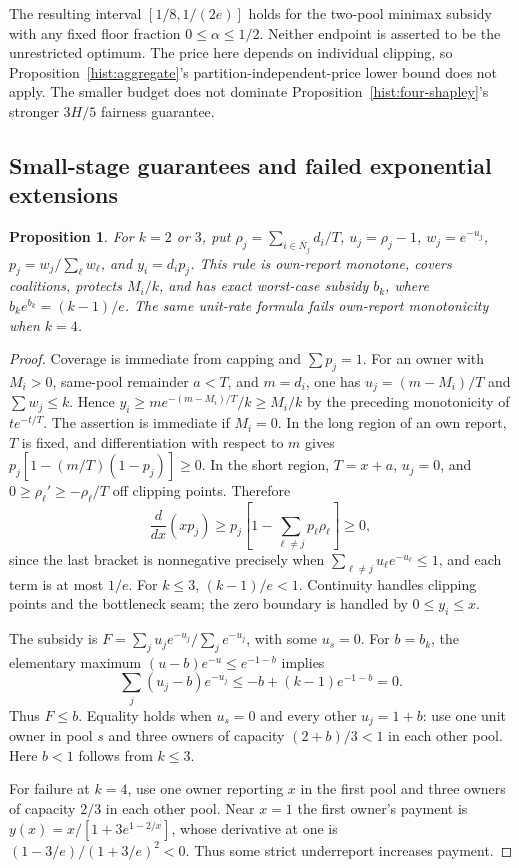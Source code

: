 \documentclass[11pt]{article}
\newtheorem{proposition}[theorem]{Proposition}
\theoremstyle{definition}\newtheorem{definition}[theorem]{Definition}
\theoremstyle{remark}\newtheorem{remark}[theorem]{Remark}
\begin{document}
The resulting interval $[1/8,1/(2e)]$ holds for the two-pool minimax
subsidy with any fixed floor fraction $0\le\alpha\le1/2$.
Neither endpoint is asserted to be the unrestricted optimum. The price
here depends on individual clipping, so Proposition~\ref{hist:aggregate}'s
partition-independent-price lower bound does not apply. The smaller
budget does not dominate Proposition~\ref{hist:four-shapley}'s stronger
$3H/5$ fairness guarantee.

\subsection{Small-stage guarantees and failed exponential extensions}
\begin{proposition}\label{hist:softmax}
For $k=2$ or $3$, put $\rho_j=\sum_{i\in N_j}d_i/T$, $u_j=\rho_j-1$,
$w_j=e^{-u_j}$, $p_j=w_j/\sum_\ell w_\ell$, and $y_i=d_ip_j$.
This rule is own-report monotone, covers coalitions, protects $M_i/k$,
and has exact worst-case subsidy $b_k$, where
$b_ke^{b_k}=(k-1)/e$. The same unit-rate formula fails own-report
monotonicity when $k=4$.
\end{proposition}
\begin{proof}
Coverage is immediate from capping and $\sum p_j=1$.
For an owner with $M_i>0$, same-pool remainder $a<T$, and $m=d_i$, one
has $u_j=(m-M_i)/T$ and $\sum w_j\le k$. Hence
$y_i\ge m e^{-(m-M_i)/T}/k\ge M_i/k$ by the preceding monotonicity of
$t e^{-t/T}$. The assertion is immediate if $M_i=0$.
In the long region of an own report, $T$ is fixed, and differentiation
with respect to $m$ gives $p_j[1-(m/T)(1-p_j)]\ge0$.
In the short region, $T=x+a$, $u_j=0$, and
$0\ge\rho_\ell'\ge-\rho_\ell/T$ off clipping points. Therefore
\[
 \frac{d}{dx}(xp_j)
 \ge p_j\left[1-\sum_{\ell\ne j}p_\ell\rho_\ell\right]\ge0,
\]
since the last bracket is nonnegative precisely when
$\sum_{\ell\ne j}u_\ell e^{-u_\ell}\le1$, and each term is at most
$1/e$. For $k\le3$, $(k-1)/e<1$. Continuity handles clipping points
and the bottleneck seam; the zero boundary is handled by $0\le y_i\le x$.

The subsidy is $F=\sum_j u_je^{-u_j}/\sum_j e^{-u_j}$, with some
$u_s=0$. For $b=b_k$, the elementary maximum
$(u-b)e^{-u}\le e^{-1-b}$ implies
\[
 \sum_j(u_j-b)e^{-u_j}\le-b+(k-1)e^{-1-b}=0.
\]
Thus $F\le b$. Equality holds when $u_s=0$ and every other $u_j=1+b$:
use one unit owner in pool $s$ and three owners of capacity $(2+b)/3<1$
in each other pool. Here $b<1$ follows from $k\le3$.

For failure at $k=4$, use one owner reporting $x$ in the first pool and
three owners of capacity $2/3$ in each other pool. Near $x=1$ the first
owner's payment is
$y(x)=x/[1+3e^{1-2/x}]$, whose derivative at one is
$(1-3/e)/(1+3/e)^2<0$. Thus some strict underreport increases payment.
\end{proof}
\end{document}
